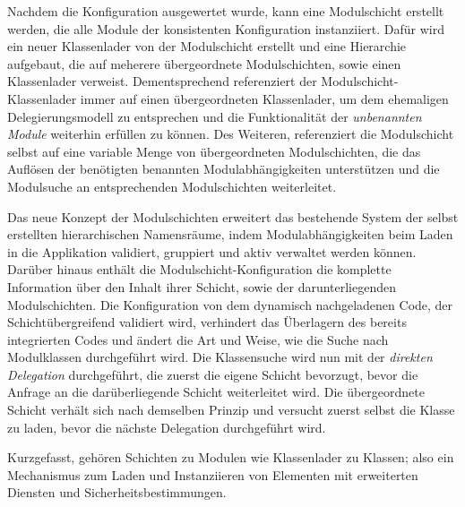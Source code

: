     Nachdem die Konfiguration ausgewertet wurde, kann eine Modulschicht erstellt werden, die alle Module der konsistenten Konfiguration instanziiert. Dafür wird ein neuer Klassenlader von der Modulschicht erstellt und eine Hierarchie aufgebaut, die auf meherere übergeordnete Modulschichten, sowie einen Klassenlader verweist. Dementsprechend referenziert der Modulschicht-Klassenlader immer auf einen übergeordneten Klassenlader, um dem ehemaligen Delegierungsmodell zu entsprechen und die Funktionalität der \textit{unbenannten Module} weiterhin erfüllen zu können. Des Weiteren, referenziert die Modulschicht selbst auf eine variable Menge von übergeordneten Modulschichten, die das Auflösen der benötigten benannten Modulabhängigkeiten unterstützen und die Modulsuche an entsprechenden Modulschichten weiterleitet. \bigbreak

    Das neue Konzept der Modulschichten erweitert das bestehende System der selbst erstellten hierarchischen Namensräume, indem Modulabhängigkeiten beim Laden in die Applikation validiert, gruppiert und aktiv verwaltet werden können. Darüber hinaus enthält die Modulschicht-Konfiguration die komplette Information über den Inhalt ihrer Schicht, sowie der darunterliegenden Modulschichten. \newline
    Die Konfiguration von dem dynamisch nachgeladenen Code, der Schichtübergreifend validiert wird, verhindert das Überlagern des bereits integrierten Codes und ändert die Art und Weise, wie die Suche nach Modulklassen durchgeführt wird. \newline
    Die Klassensuche wird nun mit der \textit{direkten Delegation} durchgeführt, die zuerst die eigene Schicht bevorzugt, bevor die Anfrage an die darüberliegende Schicht weiterleitet wird. Die übergeordnete Schicht verhält sich nach demselben Prinzip und versucht zuerst selbst die Klasse zu laden, bevor die nächste Delegation durchgeführt wird. \bigbreak

    Kurzgefasst, gehören Schichten zu Modulen wie Klassenlader zu Klassen; also ein Mechanismus zum Laden und Instanziieren von Elementen mit erweiterten Diensten und Sicherheitsbestimmungen.\cite{javaMod9,parentDelegationModel,modulMitJava9}

